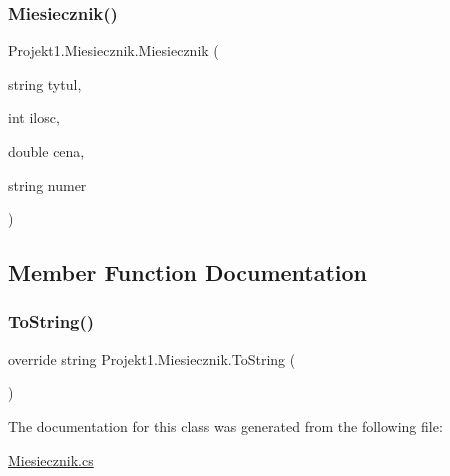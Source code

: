 \subsubsection{\texorpdfstring{Miesiecznik()}{Miesiecznik()}}
{\footnotesize\ttfamily Projekt1.\+Miesiecznik.\+Miesiecznik (\begin{DoxyParamCaption}\item[{string}]{tytul,  }\item[{int}]{ilosc,  }\item[{double}]{cena,  }\item[{string}]{numer }\end{DoxyParamCaption})}



\subsection{Member Function Documentation}
\mbox{\label{class_projekt1_1_1_miesiecznik_ad372fc0103861869a3d80a454afcc59f}} 
\subsubsection{\texorpdfstring{ToString()}{ToString()}}
{\footnotesize\ttfamily override string Projekt1.\+Miesiecznik.\+To\+String (\begin{DoxyParamCaption}{ }\end{DoxyParamCaption})}



The documentation for this class was generated from the following file\+:\begin{DoxyCompactItemize}
\item 
\mbox{\hyperlink{_miesiecznik_8cs}{Miesiecznik.\+cs}}\end{DoxyCompactItemize}

